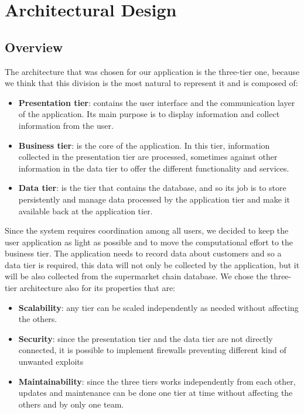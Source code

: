\chapter{Architectural Design}


\section{Overview}
The architecture that was chosen for our application is the three-tier one, because we think that this division is the most natural to represent it and is composed of:
\begin{itemize}
    \item \textbf{Presentation tier}: contains the user interface and the communication layer of the application. Its main purpose is to display information and collect information from the user.

    \item \textbf{Business tier}: is the core of the application. In this tier, information collected in the presentation tier are processed, sometimes against other information in the data tier to offer the different functionality and services.

    \item \textbf{Data tier}: is the tier that contains the database, and so its job is to store persistently and manage data processed by the application tier and make it available back at the application tier.
\end{itemize}
Since the system requires coordination among all users, we decided to keep the user application as light as possible and to move the computational effort to the business tier.
The application needs to record data about customers and so a data tier is required, this data will not only be collected by the application, but it will be also collected from the supermarket chain database.
We chose the three-tier architecture also for its properties that are:
\begin{itemize}
    \item \textbf{Scalability}: any tier can be scaled independently as needed without affecting the others.

    \item \textbf{Security}: since the presentation tier and the data tier are not directly connected, it is possible to implement firewalls preventing different kind of unwanted exploits

    \item \textbf{Maintainability}: since the three tiers works independently from each other, updates and maintenance can be done one tier at time without affecting the others and by only one team.
\end{itemize}
